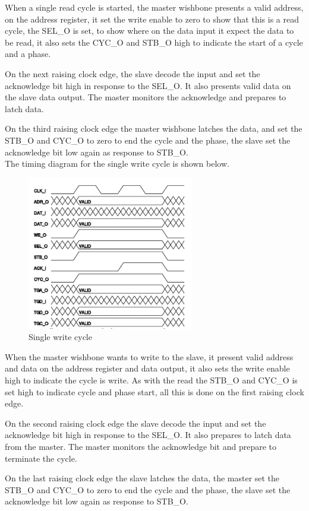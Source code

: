 When a single read cycle is started, the master wishbone presents a valid address, on the address register, it set the write enable to zero to show that this is a read cycle, the SEL\_O is set, to show where on the data input it expect the data to be read, it also sets the CYC\_O and STB\_O high to indicate the start of a cycle and a phase.


On the next raising clock edge, the slave decode the input and set the acknowledge bit high in response to the SEL\_O. It also presents valid data on the slave data output. The master monitors the acknowledge and prepares to latch data.


On the third raising clock edge the master wishbone latches the data, and set the STB\_O and CYC\_O to zero to end the cycle and the phase, the slave set the acknowledge bit low again as response to STB\_O.\\
The timing diagram for the single write cycle is shown below.
\begin{figure}[H]
	\begin{centering}
		 \includegraphics[width=0.65\textwidth]{images/wb_single_write.png}
		\caption{Single write cycle}
	\end{centering}
\end{figure}
When the master wishbone wants to write to the slave, it present valid address and data on the address register and data output, it also sets the write enable high to indicate the cycle is write. As with the read the STB\_O and CYC\_O is set high to indicate cycle and phase start, all this is done on the first raising clock edge.

On the second raising clock edge the slave decode the input and set the acknowledge bit high in response to the SEL\_O. It also prepares to latch data from the master. The master monitors the acknowledge bit and prepare to terminate the cycle.

On the last raising clock edge the slave latches the data, the master set the STB\_O and CYC\_O to zero to end the cycle and the phase, the slave set the acknowledge bit low again as response to STB\_O.
